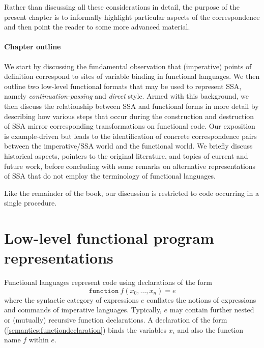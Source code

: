 
Rather than discussing all these considerations in detail, the purpose
of the present chapter is to informally highlight particular aspects
of the correspondence and then point the reader to some more advanced
material.

\paragraph{Chapter outline}
We start by discussing the fundamental observation that (imperative)
points of definition correspond to sites of variable binding in
functional languages. We then outline two low-level functional
formats that may be used to represent SSA, namely
\emph{continuation-passing} and \emph{direct} style. Armed with
this background, we then discuss the relationship between SSA and
functional forms in more detail by describing how various steps that
occur during the construction and destruction of SSA mirror
corresponding transformations on functional code.  Our exposition is
example-driven but leads to the identification of concrete
correspondence pairs between the imperative/SSA world and the
functional world. We briefly discuss historical aspects, pointers to
the original literature, and topics of current and future work, before
concluding with some remarks on alternative representations of
SSA that do not employ the terminology of functional languages.

Like the remainder of the book, our discussion is restricted to code
occurring in a single procedure.

\section{Low-level functional program representations}
\label{section:Part1:Semantics:LowLevelReps}

Functional languages represent code using declarations of the form
\begin{equation}
\label{semantics:functiondeclaration}
\mathtt{function}\ f(x_0, \ldots, x_n) = e
\end{equation} 
where the syntactic category of expressions $e$ conflates the notions
of expressions and commands of imperative languages. Typically, $e$
may contain further nested or (mutually) recursive function
declarations. A declaration of the form
(\ref{semantics:functiondeclaration}) binds the variables $x_i$ and
also the function name $f$ within $e$.

